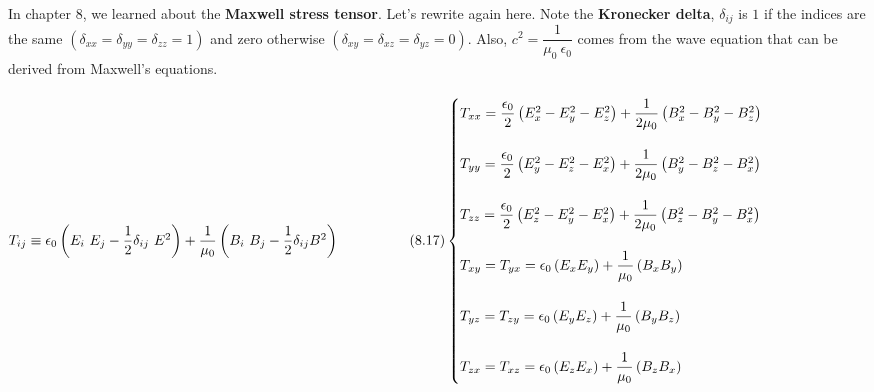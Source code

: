 \documentclass[fleqn]{article}
\begin{document}
\begin{enumerate}
\begin{enumerate}
          \textcolor{hwColor}{
            \\
            In chapter 8, we learned about the \textbf{Maxwell stress tensor}. Let's rewrite again here. Note the  \textbf{Kronecker delta},
            $\delta_{ij}$ is $1$ if the indices are the same $(\delta_{xx}=\delta_{yy}=\delta_{zz}=1)$ and zero otherwise
            $(\delta_{xy}=\delta_{xz}=\delta_{yz}=0)$. Also, $c^2=\dfrac{1}{\mu_0 ~ \epsilon_0}$ comes from the wave equation that  
            can be derived from Maxwell's equations.
            \\
            \\
            $
              T_{ij} \equiv \epsilon_0 \left(E_i ~ E_j -\dfrac{1}{2} \delta_{ij} ~ E^2 \right)
              +\dfrac{1}{\mu_0} \left(B_i ~ B_j -\dfrac{1}{2} \delta_{ij} B^2 \right) ~~~~~~~~~~~~~~~ (8.17)
              \\
              \\
              \\
              \begin{cases}
                T_{xx}=\dfrac{\epsilon_0}{2} \left(E_x^2-E_y^2-E_z^2\right)+\dfrac{1}{2 \mu_0} \left(B_x^2-B_y^2-B_z^2\right)
                \\
                \\
                T_{yy}=\dfrac{\epsilon_0}{2} \left(E_y^2-E_z^2-E_x^2\right)+\dfrac{1}{2 \mu_0} \left(B_y^2-B_z^2-B_x^2\right)
                \\
                \\
                T_{zz}=\dfrac{\epsilon_0}{2} \left(E_z^2-E_y^2-E_x^2\right)+\dfrac{1}{2 \mu_0} \left(B_z^2-B_y^2-B_x^2\right)
                \\
                \\
                T_{xy}=T_{yx}=\epsilon_0 \left(E_x E_y\right)+\dfrac{1}{\mu_0} \left(B_x B_y\right)
                \\
                \\
                T_{yz}=T_{zy}=\epsilon_0 \left(E_y E_z\right)+\dfrac{1}{\mu_0} \left(B_y B_z\right)
                \\
                \\
                T_{zx}=T_{xz}=\epsilon_0 \left(E_z E_x\right)+\dfrac{1}{\mu_0} \left(B_z B_x\right)
              \end{cases}
              \\
              \\
            $
            \\
}
\end{enumerate}
\end{enumerate}
\end{document}
